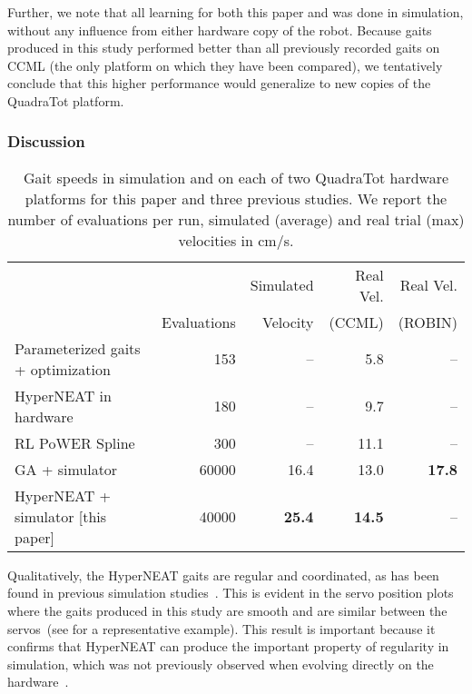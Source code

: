 Further, we note that all learning for both this paper
and \cite{glette} was done in simulation, without any influence from
either hardware copy of the robot. Because gaits produced in this
study performed better than all previously recorded gaits on CCML (the only
platform on which they have been compared), we tentatively
conclude that this higher performance would generalize to new copies
of the QuadraTot platform.

\subsubsection{Discussion}

\begin{table}
\begin{center}
\begin{tabular}{|l|r|r|r|r|}
\hline
                                         &              & Simulated  & Real Vel. & Real Vel.  \\
                                         & Evaluations  & Velocity &    (CCML)     & (ROBIN) \\
\hline
Parameterized gaits + optimization \cite{yos:clune}   &153    & --    & 5.8 & --\\
\hline
HyperNEAT in hardware \cite{yos:clune}                 & 180         & --         &   9.7  & --   \\
\hline
RL PoWER Spline \cite{haocheng}                         & 300         & --         &   11.1 & --\\
\hline
GA + simulator \cite{glette}             & 60000       & 16.4       &   13.0   & \textbf{17.8}  \\
\hline
HyperNEAT + simulator [this paper]                     & 40000       & \textbf{25.4}       &   \textbf{14.5} & --\\
\hline
\end{tabular}
\end{center}
\caption{Gait speeds in simulation and on each of two QuadraTot hardware platforms for this paper and three previous studies. We report the number of evaluations per run, simulated (average) and real trial (max) velocities in cm/s.}  %
\end{table}

Qualitatively, the HyperNEAT gaits are regular and coordinated, as has
been found in previous simulation
studies~\cite{clune2009evolving,clune2011performance}. This is evident
in the servo position plots where the gaits produced in this study are
smooth and are similar between the servos~(see 
for a representative example). This result is important because it
confirms that HyperNEAT can produce the important property of
regularity in simulation, which was not previously observed when
evolving directly on the hardware~\cite{yos:clune}.

